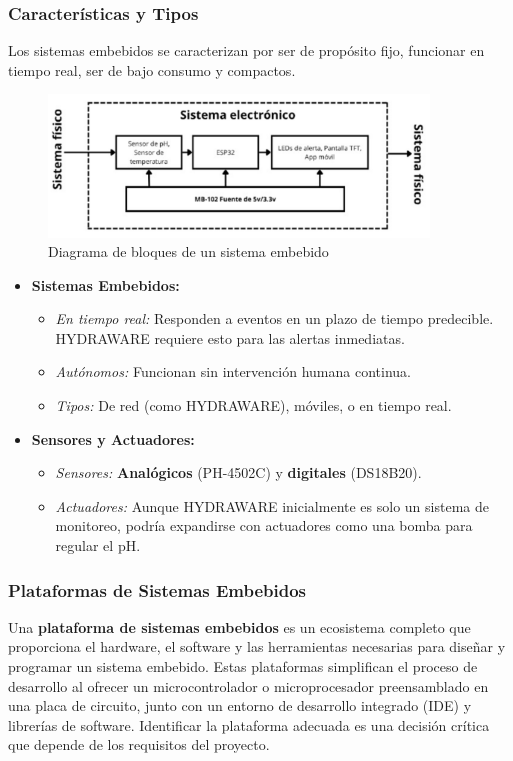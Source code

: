 \documentclass[a4paper,12pt]{article}
\begin{document}
	\subsubsection{Características y Tipos}
	Los sistemas embebidos se caracterizan por ser de propósito fijo, funcionar en tiempo real, ser de bajo consumo y compactos.
	\begin{figure}[h]
		\centering
		\includegraphics[width=0.9\textwidth]{diagrama.png}
		\caption{Diagrama de bloques de un sistema embebido}
	\end{figure}
	\begin{itemize}
		\item \textbf{Sistemas Embebidos:}
		\begin{itemize}
			\item \textit{En tiempo real:} Responden a eventos en un plazo de tiempo predecible. HYDRAWARE requiere esto para las alertas inmediatas.
			\item \textit{Autónomos:} Funcionan sin intervención humana continua.
			\item \textit{Tipos:} De red (como HYDRAWARE), móviles, o en tiempo real.
		\end{itemize}
		\item \textbf{Sensores y Actuadores:}
		\begin{itemize}
			\item \textit{Sensores:} \textbf{Analógicos} (PH-4502C) y \textbf{digitales} (DS18B20).
			\item \textit{Actuadores:} Aunque HYDRAWARE inicialmente es solo un sistema de monitoreo, podría expandirse con actuadores como una bomba para regular el pH.
		\end{itemize}
	\end{itemize}
	
	\subsubsection{Plataformas de Sistemas Embebidos}
	Una \textbf{plataforma de sistemas embebidos} es un ecosistema completo que proporciona el hardware, el software y las herramientas necesarias para diseñar y programar un sistema embebido. Estas plataformas simplifican el proceso de desarrollo al ofrecer un microcontrolador o microprocesador preensamblado en una placa de circuito, junto con un entorno de desarrollo integrado (IDE) y librerías de software. Identificar la plataforma adecuada es una decisión crítica que depende de los requisitos del proyecto.
	
\end{document}
